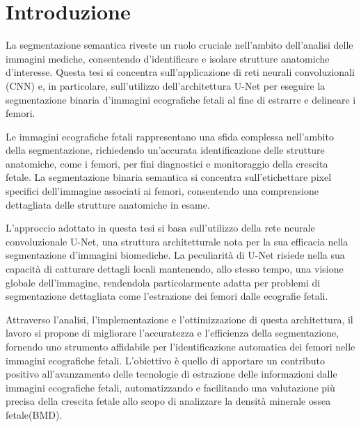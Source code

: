 
\chapter{Introduzione} \label{chap:Introduzione}

La segmentazione semantica riveste un ruolo cruciale nell'ambito dell'analisi
delle immagini mediche, consentendo d'identificare e isolare strutture
anatomiche d'interesse. Questa tesi si concentra sull'applicazione di reti
neurali convoluzionali (CNN) e, in particolare, sull'utilizzo dell'architettura
U-Net per eseguire la segmentazione binaria d'immagini ecografiche fetali al
fine di estrarre e delineare i femori.

Le immagini ecografiche fetali rappresentano una sfida complessa nell'ambito
della segmentazione, richiedendo un'accurata identificazione delle strutture
anatomiche, come i femori, per fini diagnostici e monitoraggio della crescita
fetale. La segmentazione binaria semantica si concentra sull'etichettare pixel
specifici dell'immagine associati ai femori, consentendo una comprensione
dettagliata delle strutture anatomiche in esame.

L'approccio adottato in questa tesi si basa sull'utilizzo della rete neurale
convoluzionale U-Net, una struttura architetturale nota per la sua efficacia
nella segmentazione d'immagini biomediche. La peculiarità di U-Net risiede
nella sua capacità di catturare dettagli locali mantenendo, allo stesso tempo,
una visione globale dell'immagine, rendendola particolarmente adatta per
problemi di segmentazione dettagliata come l'estrazione dei femori dalle
ecografie fetali.

Attraverso l'analisi, l'implementazione e l'ottimizzazione di questa
architettura, il lavoro si propone di migliorare l'accuratezza e l'efficienza
della segmentazione, fornendo uno strumento affidabile per l'identificazione
automatica dei femori nelle immagini ecografiche fetali. L'obiettivo è quello di
apportare un contributo positivo all'avanzamento delle tecnologie di estrazione
delle informazioni dalle immagini ecografiche fetali, automatizzando e
facilitando una valutazione più precisa della crescita fetale allo scopo di
analizzare la densità minerale ossea fetale(BMD).
